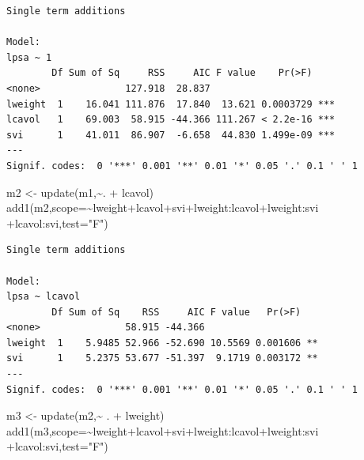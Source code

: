\documentclass[
  dutch,
  letterpaper,
  12pt]{book}
\newenvironment{Shaded}{\begin{snugshade}}{\end{snugshade}}
\newcommand{\AttributeTok}[1]{\textcolor[rgb]{0.40,0.45,0.13}{#1}}
\newcommand{\FunctionTok}[1]{\textcolor[rgb]{0.28,0.35,0.67}{#1}}
\newcommand{\NormalTok}[1]{\textcolor[rgb]{0.00,0.23,0.31}{#1}}
\newcommand{\OtherTok}[1]{\textcolor[rgb]{0.00,0.23,0.31}{#1}}
\newcommand{\SpecialCharTok}[1]{\textcolor[rgb]{0.37,0.37,0.37}{#1}}
\newcommand{\StringTok}[1]{\textcolor[rgb]{0.13,0.47,0.30}{#1}}
\newcounter{none} %
\theoremstyle{definition}
\theoremstyle{definition}
\theoremstyle{definition}
\theoremstyle{remark}
\begin{document}
\begin{verbatim}
Single term additions

Model:
lpsa ~ 1
        Df Sum of Sq     RSS     AIC F value    Pr(>F)    
<none>               127.918  28.837                      
lweight  1    16.041 111.876  17.840  13.621 0.0003729 ***
lcavol   1    69.003  58.915 -44.366 111.267 < 2.2e-16 ***
svi      1    41.011  86.907  -6.658  44.830 1.499e-09 ***
---
Signif. codes:  0 '***' 0.001 '**' 0.01 '*' 0.05 '.' 0.1 ' ' 1
\end{verbatim}

\begin{Shaded}
\begin{Highlighting}[]
\NormalTok{m2 }\OtherTok{\textless{}{-}} \FunctionTok{update}\NormalTok{(m1,}\SpecialCharTok{\textasciitilde{}}\NormalTok{. }\SpecialCharTok{+}\NormalTok{ lcavol)}
\FunctionTok{add1}\NormalTok{(m2,}\AttributeTok{scope=}\SpecialCharTok{\textasciitilde{}}\NormalTok{lweight}\SpecialCharTok{+}\NormalTok{lcavol}\SpecialCharTok{+}\NormalTok{svi}\SpecialCharTok{+}\NormalTok{lweight}\SpecialCharTok{:}\NormalTok{lcavol}\SpecialCharTok{+}\NormalTok{lweight}\SpecialCharTok{:}\NormalTok{svi }\SpecialCharTok{+}\NormalTok{lcavol}\SpecialCharTok{:}\NormalTok{svi,}\AttributeTok{test=}\StringTok{"F"}\NormalTok{)}
\end{Highlighting}
\end{Shaded}

\begin{verbatim}
Single term additions

Model:
lpsa ~ lcavol
        Df Sum of Sq    RSS     AIC F value   Pr(>F)   
<none>               58.915 -44.366                    
lweight  1    5.9485 52.966 -52.690 10.5569 0.001606 **
svi      1    5.2375 53.677 -51.397  9.1719 0.003172 **
---
Signif. codes:  0 '***' 0.001 '**' 0.01 '*' 0.05 '.' 0.1 ' ' 1
\end{verbatim}

\begin{Shaded}
\begin{Highlighting}[]
\NormalTok{m3 }\OtherTok{\textless{}{-}} \FunctionTok{update}\NormalTok{(m2,}\SpecialCharTok{\textasciitilde{}}\NormalTok{ . }\SpecialCharTok{+}\NormalTok{ lweight)}
\FunctionTok{add1}\NormalTok{(m3,}\AttributeTok{scope=}\SpecialCharTok{\textasciitilde{}}\NormalTok{lweight}\SpecialCharTok{+}\NormalTok{lcavol}\SpecialCharTok{+}\NormalTok{svi}\SpecialCharTok{+}\NormalTok{lweight}\SpecialCharTok{:}\NormalTok{lcavol}\SpecialCharTok{+}\NormalTok{lweight}\SpecialCharTok{:}\NormalTok{svi }\SpecialCharTok{+}\NormalTok{lcavol}\SpecialCharTok{:}\NormalTok{svi,}\AttributeTok{test=}\StringTok{"F"}\NormalTok{)}
\end{Highlighting}
\end{Shaded}
\end{document}
